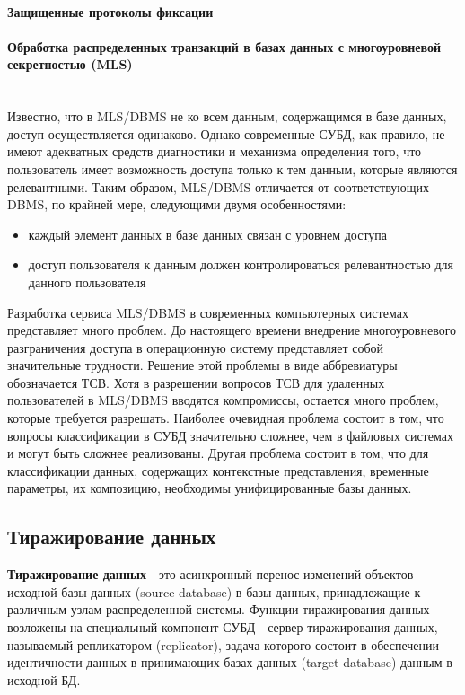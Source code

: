 \paragraph{Защищенные протоколы фиксации}
\paragraph{Обработка распределенных транзакций в базах данных с многоуровневой секретностью (MLS)}~\\
Известно, что в MLS/DBMS не ко всем данным, содержащимся в  базе
данных, доступ осуществляется одинаково. Однако современные СУБД, как
правило,  не имеют адекватных средств диагностики и механизма определения
того, что пользователь имеет возможность доступа только  к  тем
данным,  которые являются релевантными. Таким образом, MLS/DBMS отличается
от соответствующих DBMS,  по крайней  мере,  следующими  двумя
особенностями:
\begin{itemize}
    \item каждый элемент данных в базе данных связан с уровнем доступа
    \item доступ пользователя к данным должен контролироваться релевантностью для данного пользователя
\end{itemize}
Разработка сервиса MLS/DBMS в современных компьютерных  системах
представляет  много  проблем. До настоящего времени внедрение многоуровневого
разграничения доступа в операционную  систему  представляет
собой  значительные трудности. Решение этой проблемы в виде аббревиатуры
обозначается ТСВ. Хотя в разрешении вопросов ТСВ  для  удаленных
пользователей  в  MLS/DBMS вводятся компромиссы, остается много проблем,
которые требуется разрешать. Наиболее очевидная проблема состоит
в том, что вопросы классификации в СУБД значительно  сложнее,  чем  в
файловых  системах  и могут быть сложнее реализованы. Другая проблема
состоит в том, что для классификации данных,  содержащих  контекстные
представления,  временные параметры, их композицию, необходимы унифицированные базы данных.

\subsection{Тиражирование данных}
\textbf{Тиражирование данных} - это асинхронный перенос изменений объектов исходной базы данных (source database)
в базы данных, принадлежащие к различным узлам распределенной системы.
Функции тиражирования данных возложены на специальный компонент СУБД - сервер тиражирования данных,
называемый репликатором (replicator), задача которого состоит в обеспечении идентичности данных в принимающих
базах данных (target database) данным в исходной БД.


